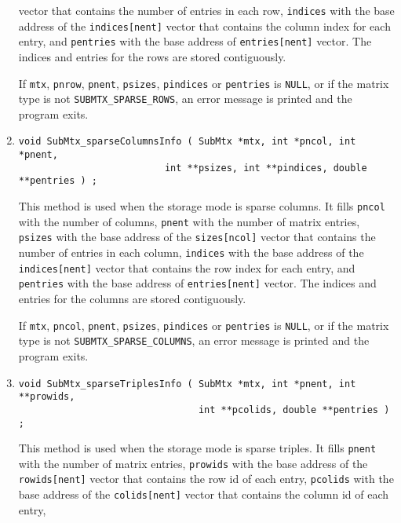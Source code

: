 \begin{enumerate}
vector that contains the number of entries in each row,
{\tt *indices} with the base address of the {\tt indices[nent]}
vector that contains the column index for each entry,
and {\tt *pentries} with the base address of {\tt entries[nent]} vector.
The indices and entries for the rows are stored contiguously.
\par {}
If {\tt mtx}, {\tt pnrow}, {\tt pnent}, {\tt psizes}, {\tt pindices} or
{\tt pentries} is {\tt NULL},
or if the matrix type is not {\tt SUBMTX\_SPARSE\_ROWS},
an error message is printed and the program exits.
\item
\begin{verbatim}
void SubMtx_sparseColumnsInfo ( SubMtx *mtx, int *pncol, int *pnent, 
                          int **psizes, int **pindices, double **pentries ) ;
\end{verbatim}
This method is used when the storage mode is sparse columns.
It fills
{\tt *pncol} with the number of columns,
{\tt *pnent} with the number of matrix entries,
{\tt *psizes} with the base address of the {\tt sizes[ncol]}
vector that contains the number of entries in each column,
{\tt *indices} with the base address of the {\tt indices[nent]}
vector that contains the row index for each entry,
and {\tt *pentries} with the base address of {\tt entries[nent]} vector.
The indices and entries for the columns are stored contiguously.
\par {}
If {\tt mtx}, {\tt pncol}, {\tt pnent}, {\tt psizes}, {\tt pindices} or
{\tt pentries} is {\tt NULL},
or if the matrix type is not {\tt SUBMTX\_SPARSE\_COLUMNS},
an error message is printed and the program exits.
\item
\begin{verbatim}
void SubMtx_sparseTriplesInfo ( SubMtx *mtx, int *pnent, int **prowids, 
                                int **pcolids, double **pentries ) ;
\end{verbatim}
This method is used when the storage mode is sparse triples.
It fills
{\tt *pnent} with the number of matrix entries,
{\tt *prowids} with the base address of the {\tt rowids[nent]}
vector that contains the row id of each entry,
{\tt *pcolids} with the base address of the {\tt colids[nent]}
vector that contains the column id of each entry,

\end{enumerate}
